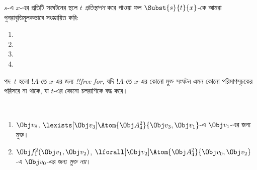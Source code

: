\documentclass[../../../include/open-logic-section]{subfiles}
\begin{document}


\begin{defn}[পদে প্রতিস্থাপন]
$s$-এ $x$-এর প্রতিটি সংঘটনের স্থলে $t$ \emph{প্রতিস্থাপন} করে পাওয়া
ফল $\Subst{s}{t}{x}$-কে আমরা পুনরাবৃত্তিমূলকভাবে সংজ্ঞায়িত করি:
\begin{enumerate}
\item {}

\item {}

\item {}

\item{}
\end{enumerate}
\end{defn}

\begin{defn}
পদ~$t$ হলো $!A$-তে $x$-এর জন্য \emph{!!{free for}}, যদি $!A$-তে
$x$-এর কোনো মুক্ত সংঘটন এমন কোনো পরিমাণসূচকের পরিসরে না থাকে, যা
$t$-এর কোনো চলরাশিকে বদ্ধ করে।
\end{defn}

\begin{ex} ~
\begin{enumerate}
\item $\Obj v_8$, $\lexists[\Obj
  v_3]\Atom{\Obj A^2_4}{\Obj v_3,\Obj v_1}$-এ $\Obj v_1$-এর জন্য মুক্ত।

\item $\Obj f^2_1(\Obj v_1, \Obj v_2)$,
  $\lforall[\Obj v_2]\Atom{\Obj A^2_4}{\Obj v_0,\Obj v_2}$-এ
  $\Obj v_0$-এর জন্য \emph{মুক্ত নয়}।
\end{enumerate}
\end{ex}
\end{document}
